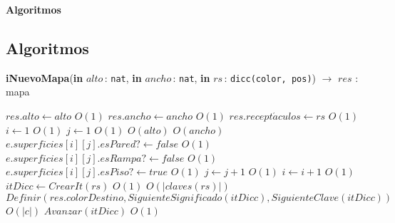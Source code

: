 \documentclass[a4paper,10pt]{article}
\let\TipoVariable=\texttt
\let\ModificadorArgumento=\textbf
\newcommand{\In}[2]{\ModificadorArgumento{in} \ensuremath{#1}\,: \TipoVariable{#2}\xspace}
\newenvironment{Algoritmos}{%
  \vspace*{2ex}%
  \noindent\textbf{\Large Algoritmos}%
  \vspace*{2ex}%
}{}
\begin{document}
\begin{Algoritmos}
  
\medskip

\subsection{Algoritmos}

  
\begin{algorithm}[H]{\textbf{iNuevoMapa}(\In{alto}{nat}, \In{ancho}{nat}, \In{rs}{dicc(color, pos)}) $\to$ $res$ : mapa}
      \begin{algorithmic}[1]
        \State $res.alto \gets alto$                                                                        \Comment $O(1)$
        \State $res.ancho \gets ancho$                                                                      \Comment $O(1)$
        \State $res.recept\acute{a}culos \gets rs$                                                          \Comment $O(1)$
        \State $i \gets 1$                                                                                  \Comment $O(1)$
        \State $j \gets 1$                                                                                  \Comment $O(1)$
                                                                                   \Comment $O(alto)$
                                                                                  \Comment $O(ancho)$
                \State $e.superficies[i][j].esPared? \gets false$                                           \Comment $O(1)$
                \State $e.superficies[i][j].esRampa? \gets false$                                           \Comment $O(1)$
                \State $e.superficies[i][j].esPiso? \gets true$                                             \Comment $O(1)$
                \State $j \gets j+1$                                                                        \Comment $O(1)$
            \EndWhile
            \State $i \gets i+1$                                                                            \Comment $O(1)$
        \EndWhile
        \State $itDicc \gets CrearIt(rs)$                                                                   \Comment $O(1)$
                                                                             \Comment $O(|claves(rs)|)$
            \State $Definir(res.colorDestino, SiguienteSignificado(itDicc), SiguienteClave(itDicc))$        \Comment $O(|c|)$
            \State $Avanzar(itDicc)$                                                                        \Comment $O(1)$    
        \EndWhile
      

\end{algorithmic}
\end{algorithm}
\end{Algoritmos}
\end{document}
